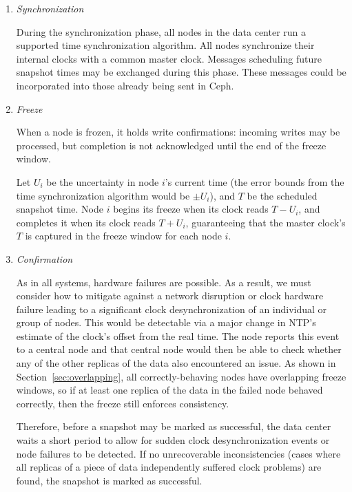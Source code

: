 \begin{enumerate}

\item \emph{Synchronization}

  During the synchronization phase, all nodes in the data center run a
  supported time synchronization algorithm. All nodes synchronize
  their internal clocks with a common master
  clock\footnotemark. Messages scheduling future snapshot times may be
  exchanged during this phase. These messages could be incorporated
  into those already being sent in Ceph.


\item \emph{Freeze}
 
 When a node is frozen, it holds write confirmations: incoming writes
 may be processed, but completion is not acknowledged until the end
 of the freeze window.
 
 Let $U_i$ be the uncertainty in node $i$'s current time (the error
 bounds from the time synchronization algorithm would be $\pm U_i$), and
 $T$ be the scheduled snapshot time. Node $i$ begins its freeze when
 its clock reads $T - U_i$, and completes it when its clock reads
 $T + U_i$, guaranteeing that the master clock's $T$ is captured in
 the freeze window for each node $i$.

\item \emph{Confirmation}

  As in all systems, hardware failures are possible. As a result, we
  must consider how to mitigate against a network disruption or clock
  hardware failure leading to a significant clock desynchronization of
  an individual or group of nodes. This would be detectable via a
  major change in NTP's estimate of the clock's offset from the real
  time. The node reports this event to a central node and that central
  node would then be able to check whether any of the other replicas
  of the data also encountered an issue. As shown in
  Section~\ref{sec:overlapping}, all correctly-behaving nodes have
  overlapping freeze windows, so if at least one replica of the data
  in the failed node behaved correctly, then the freeze still enforces
  consistency.
 
  Therefore, before a snapshot may be marked as successful, the data
  center waits a short period to allow for sudden clock
  desynchronization events or node failures to be detected. If no
  unrecoverable inconsistencies (cases where all replicas of a piece
  of data independently suffered clock problems) are found, the
  snapshot is marked as successful.


\end{enumerate}
